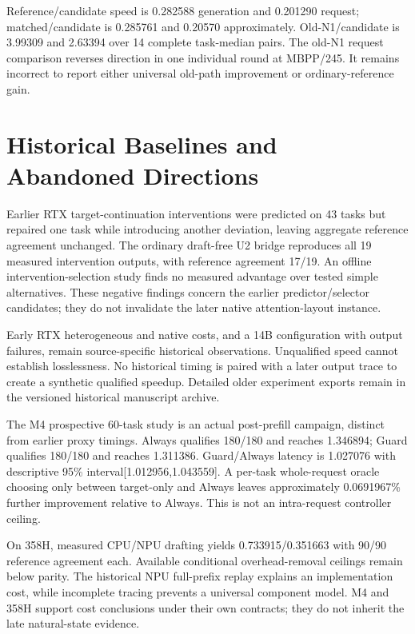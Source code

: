\documentclass{article}
\begin{document}
Reference/candidate speed is 0.282588 generation and 0.201290 request; matched/candidate is 0.285761 and 0.20570 approximately. Old-N1/candidate is 3.99309 and 2.63394 over 14 complete task-median pairs. The old-N1 request comparison reverses direction in one individual round at MBPP/245. It remains incorrect to report either universal old-path improvement or ordinary-reference gain.

\section{Historical Baselines and Abandoned Directions}
Earlier RTX target-continuation interventions were predicted on 43 tasks but repaired one task while introducing another deviation, leaving aggregate reference agreement unchanged. The ordinary draft-free U2 bridge reproduces all 19 measured intervention outputs, with reference agreement 17/19. An offline intervention-selection study finds no measured advantage over tested simple alternatives. These negative findings concern the earlier predictor/selector candidates; they do not invalidate the later native attention-layout instance.

Early RTX heterogeneous and native costs, and a 14B configuration with output failures, remain source-specific historical observations. Unqualified speed cannot establish losslessness. No historical timing is paired with a later output trace to create a synthetic qualified speedup. Detailed older experiment exports remain in the versioned historical manuscript archive.

The M4 prospective 60-task study is an actual post-prefill campaign, distinct from earlier proxy timings. Always qualifies 180/180 and reaches 1.346894; Guard qualifies 180/180 and reaches 1.311386. Guard/Always latency is 1.027076 with descriptive 95\% interval[1.012956,1.043559]. A per-task whole-request oracle choosing only between target-only and Always leaves approximately 0.0691967\% further improvement relative to Always. This is not an intra-request controller ceiling.

On 358H, measured CPU/NPU drafting yields 0.733915/0.351663 with 90/90 reference agreement each. Available conditional overhead-removal ceilings remain below parity. The historical NPU full-prefix replay explains an implementation cost, while incomplete tracing prevents a universal component model. M4 and 358H support cost conclusions under their own contracts; they do not inherit the late natural-state evidence.
\end{document}
